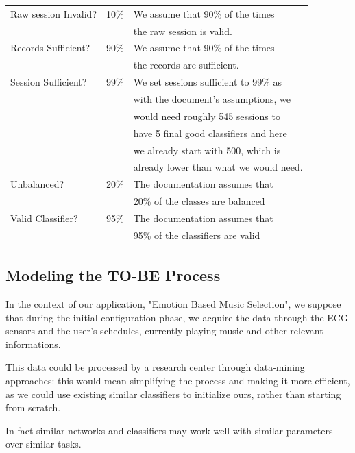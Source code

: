 \begin{table}[H]
\begin{tabularx}{\textwidth}{|X|c|l|}
    \hline
    Raw session Invalid? & 10\% & We assume that 90\% of the times
    \\ & & the raw session is valid.\\
    \hline
    Records Sufficient? & 90\% & We assume that 90\% of the times
    \\ & & the records are sufficient.\\
    \hline
    Session Sufficient? & 99\% & We set sessions sufficient to 99\% as
    \\ & & with the document's assumptions, we 
    \\ & & would need roughly 545 sessions to 
    \\ & & have 5 final good classifiers and here
    \\ & &  we already start with 500, which is
    \\ & & already lower than what we would need.\\
    \hline
    Unbalanced? & 20\% & The documentation assumes that
    \\ & &  20\% of the classes are balanced\\
    \hline
    Valid Classifier? & 95\% & The documentation assumes that
    \\ & &  95\% of the classifiers are valid\\
    \hline

\end{tabularx}
\end{table}


\subsection{Modeling the TO-BE Process}
\label{sec:modeling_to_be_processing}

In the context of our application, "Emotion Based Music Selection", we suppose that during the initial configuration phase, we acquire the data through the ECG sensors and the user's schedules, currently playing music and other relevant informations.

This data could be processed by a research center through data-mining approaches: this would mean simplifying the process and making it more efficient, as we could use existing similar classifiers to initialize ours, rather than starting from scratch.

In fact similar networks and classifiers may work well with similar parameters over similar tasks.

